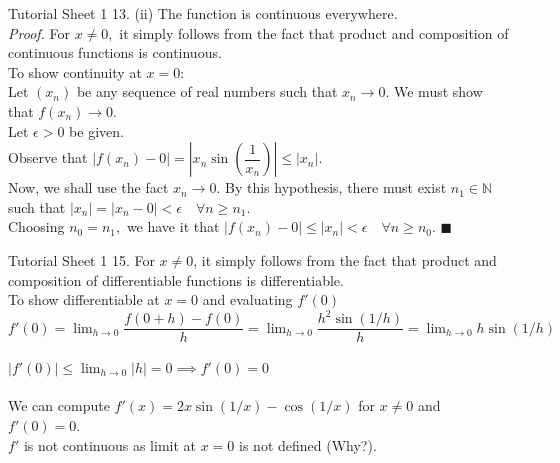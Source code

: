 \documentclass[aspectratio=169]{beamer}
\begin{document}
\begin{frame}{Tutorial Sheet 1}
	13. (ii) The function is continuous everywhere.\\
	\emph{Proof.} For $x \neq 0,$ it simply follows from the fact that product and composition of continuous functions is continuous.\\
	To show continuity at $x = 0:$\\
	Let $(x_n)$ be any sequence of real numbers such that $x_n \to 0.$ We must show that $f(x_n) \to 0.$\\
	Let $\epsilon > 0$ be given.\\
	Observe that $|f(x_n) - 0| = \left|x_n\sin\left(\dfrac{1}{x_n}\right)\right| \le |x_n|.$\\
	Now, we shall use the fact $x_n \to 0.$ By this hypothesis, there must exist $n_1 \in \mathbb{N}$ such that $|x_n| = |x_n - 0| < \epsilon \quad \forall n \ge n_1.$\\
	Choosing $n_0 = n_1,$ we have it that $|f(x_n) - 0| \le |x_n| < \epsilon \quad \forall n \ge n_0.$ \hfill $\blacksquare$
\end{frame}

\begin{frame}{Tutorial Sheet 1}
	15. For $x \neq 0$, it simply follows from the fact that product and composition of differentiable functions is differentiable. \\
	To show differentiable at $x = 0$ and evaluating $f'(0)$ \\
	$f'(0) = \displaystyle\lim_{h\to 0}\dfrac{f(0+h) - f(0)}{h} = \displaystyle\lim_{h\to 0}\dfrac{h^2 \sin(1/h)}{h} = \displaystyle\lim_{h\to 0}h\sin(1/h)$ \\~\\
	$|f'(0)| \le \displaystyle\lim_{h\to 0} |h| = 0 \implies f'(0) = 0$ \\~\\
	 We can compute $f'(x) = 2x\sin(1/x) - \cos(1/x)$ for $x \neq 0$ and $f'(0) = 0$. \\
	$f'$ is not continuous as limit at $x = 0$ is not defined (Why?). \\
\end{frame}
\end{document}
